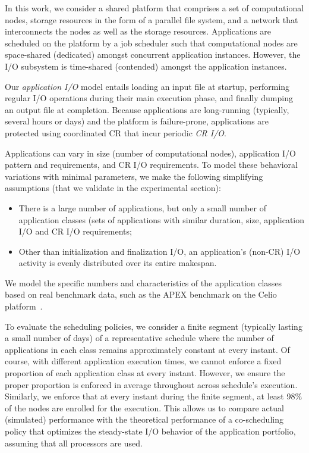 In this work, we consider a shared platform that comprises a set of computational
nodes, storage resources in the form of a parallel file system, and a network that
interconnects the nodes as well as the storage resources. Applications are scheduled
on the platform by a job scheduler such that computational nodes are space-shared
(dedicated) amongst concurrent application instances. However, the I/O subsystem is
time-shared (contended) amongst the application instances.

Our \emph{application I/O} model entails loading an input file at startup, performing
regular I/O operations during their main execution phase, and finally dumping an
output file at completion. Because applications are long-running (typically, several
hours or days) and the platform is failure-prone, applications are protected using
coordinated CR that incur periodic \emph{CR I/O}.


Applications can vary in size (number of computational nodes), application I/O
pattern and requirements, and CR I/O requirements. To model these behavioral
variations with minimal parameters, we make the following simplifying assumptions
(that we validate in the experimental section):
\begin{itemize}
  \item There is a large number of applications, but only a small number of
    application classes (sets of applications with similar duration, size,
    application I/O and CR I/O requirements;
  \item Other than initialization and finalization I/O, an application's (non-CR) I/O
    activity is evenly distributed over its entire makespan.
\end{itemize}
We model the specific numbers and characteristics of the application classes based on
real benchmark data, such as the APEX benchmark on the Celio platform~\cite{xx}.

To evaluate the scheduling policies, we consider a finite segment (typically lasting
a small number of days) of a representative schedule where the number of applications
in each class remains approximately constant at every instant. Of course, with
different application execution times, we cannot enforce a fixed proportion of each
application class at every instant. However, we ensure the proper proportion is
enforced in average throughout across schedule's execution. Similarly, we enforce
that at every instant during the finite segment, at least 98\% of the nodes
 are enrolled for the execution. This allows us to compare actual
(simulated) performance with the theoretical performance of a co-scheduling policy
that optimizes the steady-state I/O behavior of the application portfolio, assuming
that all processors are used.

